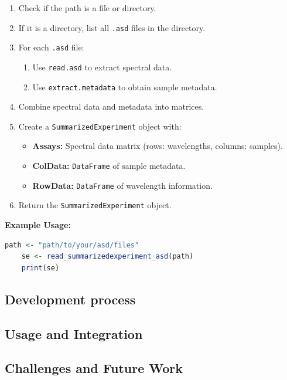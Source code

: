\documentclass[12pt,a4paper]{article}
\begin{document}
\begin{enumerate}
    \item Check if the path is a file or directory.
    \item If it is a directory, list all \texttt{.asd} files in the directory.
    \item For each \texttt{.asd} file:
    \begin{enumerate}
        \item Use \texttt{read.asd} to extract spectral data.
        \item Use \texttt{extract.metadata} to obtain sample metadata.
    \end{enumerate}
    \item Combine spectral data and metadata into matrices.
    \item Create a \texttt{SummarizedExperiment} object with:
    \begin{itemize}
        \item \textbf{Assays:} Spectral data matrix (rows: wavelengths, columns: samples).
        \item \textbf{ColData:} \texttt{DataFrame} of sample metadata.
        \item \textbf{RowData:} \texttt{DataFrame} of wavelength information.
    \end{itemize}
    \item Return the \texttt{SummarizedExperiment} object.
\end{enumerate}

\textbf{Example Usage:}

\begin{lstlisting}[language=R, style=mystyle]
    path <- "path/to/your/asd/files"
    se <- read_summarizedexperiment_asd(path)
    print(se)
    \end{lstlisting}











\subsection{Development process}
\subsection{Usage and Integration}
\subsection{Challenges and Future Work}
\end{document}
